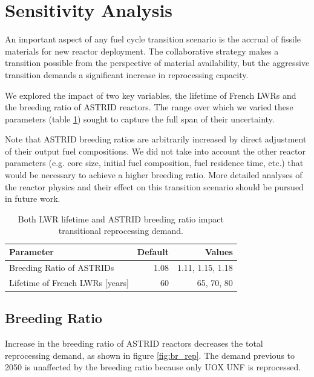\section{Sensitivity Analysis}

An important aspect of any fuel cycle transition scenario
is the accrual of fissile materials for new reactor deployment.
The collaborative strategy makes a transition possible 
from the perspective of material availability,
but the aggressive transition demands a significant increase in reprocessing capacity.

We explored the impact of two key variables, the lifetime of French \glspl{LWR} and the
breeding ratio of \gls{ASTRID} reactors. The range over which we varied these parameters (table \ref{tab:sen_par})
sought to capture the full span of their uncertainty.

Note that \gls{ASTRID} breeding ratios are arbitrarily increased
by direct adjustment of their output fuel compositions. We did not 
take into account the other reactor parameters (e.g. core size, initial
fuel composition, fuel residence time, etc.)
that would be necessary to achieve a higher breeding ratio. More detailed analyses
of the reactor physics and their effect on this transition scenario 
should be pursued in future work.


\begin{table}[h]
    \centering
    \caption{Both \gls{LWR} lifetime and \gls{ASTRID} breeding ratio impact 
    transitional reprocessing demand.}
    \begin{tabularx}{\textwidth}{lrr}
        \hline
        \textbf{Parameter} & \textbf{Default} & \textbf{Values} \\
        \hline
        Breeding Ratio of \glspl{ASTRID} & 1.08 & 1.11, 1.15, 1.18 \\ 
        Lifetime of French \glspl{LWR} [years] & 60  & 65, 70, 80 \\
        \hline
    \end{tabularx}
    \label{tab:sen_par}
\end{table}

\subsection{Breeding Ratio}


Increase in the breeding ratio of \gls{ASTRID} reactors
decreases the total reprocessing demand, as shown in 
figure \ref{fig:br_rep}.
The demand previous to 2050 is unaffected by the 
breeding ratio because only \gls{UOX} \gls{UNF} is reprocessed.

